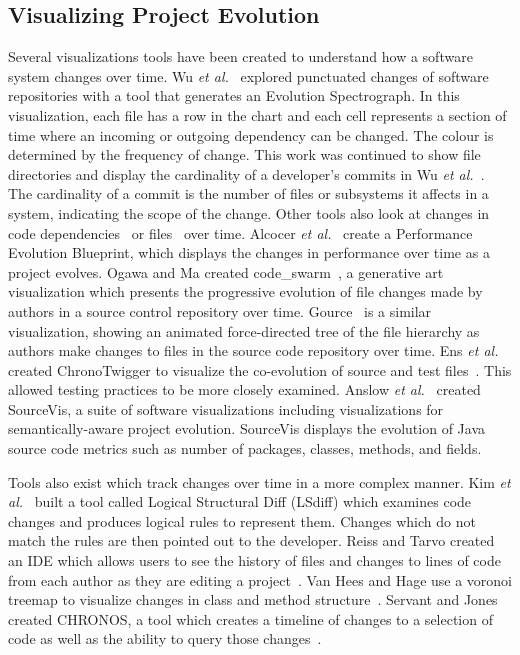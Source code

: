 \subsection{Visualizing Project Evolution}

Several visualizations tools have been created to understand how a software system changes over time. Wu \textit{et al.}~\cite{wu2004a} explored punctuated changes of software repositories with a tool that generates an Evolution Spectrograph. In this visualization, each file has a row in the chart and each cell represents a section of time where an incoming or outgoing dependency can be changed. The colour is determined by the frequency of change. This work was continued to show file directories and display the cardinality of a developer's commits in Wu \textit{et al.}~\cite{wu2004}. The cardinality of a commit is the number of files or subsystems it affects in a system, indicating the scope of the change. Other tools also look at changes in code dependencies~\cite{6980224} or files~\cite{6650525, 7332421, voinea2006} over time. Alcocer \textit{et al.}~\cite{6650523} create a Performance Evolution Blueprint, which displays the changes in performance over time as a project evolves. Ogawa and Ma created code\_swarm~\cite{codeswarm}, a generative art visualization which presents the progressive evolution of file changes made by authors in a source control repository over time. Gource~\cite{gource} is a similar visualization, showing an animated force-directed tree of the file hierarchy as authors make changes to files in the source code repository over time. Ens \textit{et al.} created ChronoTwigger to visualize the co-evolution of source and test files~\cite{6980223}. This allowed testing practices to be more closely examined. Anslow \textit{et al.}~\cite{sourcevis} created SourceVis, a suite of software visualizations including visualizations for semantically-aware project evolution. SourceVis displays the evolution of Java source code metrics such as number of packages, classes, methods, and fields.

Tools also exist which track changes over time in a more complex manner. Kim \textit{et al.}~\cite{Kim:2009:DRS:1555001.1555046} built a tool called Logical Structural Diff (LSdiff) which examines code changes and produces logical rules to represent them. Changes which do not match the rules are then pointed out to the developer. Reiss and Tarvo created an IDE which allows users to see the history of files and changes to lines of code from each author as they are editing a project~\cite{6650521}. Van Hees and Hage use a voronoi treemap to visualize changes in class and method structure~\cite{7332410}. Servant and Jones created CHRONOS, a tool which creates a timeline of changes to a selection of code as well as the ability to query those changes~\cite{6650547}.



